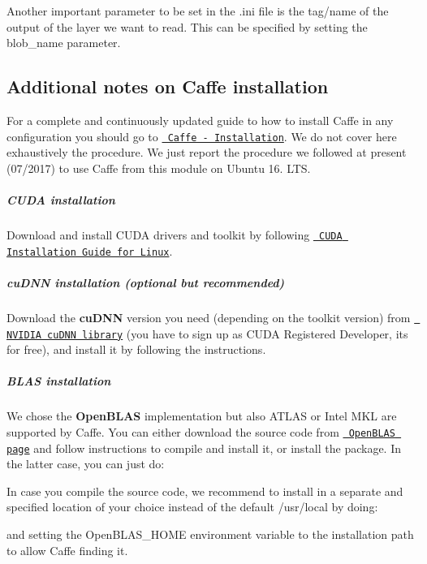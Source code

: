 Another important parameter to be set in the {\ttfamily .ini} file is the tag/name of the output of the layer we want to read. This can be specified by setting the {\ttfamily blob\+\_\+name} parameter.

\subsection*{Additional notes on Caffe installation}

For a complete and continuously updated guide to how to install Caffe in any configuration you should go to \href{http://caffe.berkeleyvision.org/installation.html}{\texttt{ Caffe -\/ Installation}}. We do not cover here exhaustively the procedure. We just report the procedure we followed at present (07/2017) to use Caffe from this module on Ubuntu 16. L\+TS.

\subparagraph*{C\+U\+DA installation}

Download and install C\+U\+DA drivers and toolkit by following \href{http://docs.nvidia.com/cuda/cuda-installation-guide-linux/\#axzz4BkDT7m6r}{\texttt{ C\+U\+DA Installation Guide for Linux}}.

\subparagraph*{cu\+D\+NN installation (optional but recommended)}

Download the {\bfseries{cu\+D\+NN}} version you need (depending on the toolkit version) from \href{https://developer.nvidia.com/cuDNN}{\texttt{ N\+V\+I\+D\+IA cu\+D\+NN library}} (you have to sign up as C\+U\+DA Registered Developer, it\textquotesingle{}s for free), and install it by following the instructions.

\subparagraph*{B\+L\+AS installation}

We chose the {\bfseries{Open\+B\+L\+AS}} implementation but also A\+T\+L\+AS or Intel M\+KL are supported by Caffe. You can either download the source code from \href{http://www.openblas.net/}{\texttt{ Open\+B\+L\+AS page}} and follow instructions to compile and install it, or install the package. In the latter case, you can just do\+:


\begin{DoxyCode}{0}
\end{DoxyCode}


In case you compile the source code, we recommend to install in a separate and specified location of your choice instead of the default {\ttfamily /usr/local} by doing\+:


\begin{DoxyCode}{0}
\end{DoxyCode}
 and setting the {\ttfamily Open\+B\+L\+A\+S\+\_\+\+H\+O\+ME} environment variable to the installation path to allow Caffe finding it.


